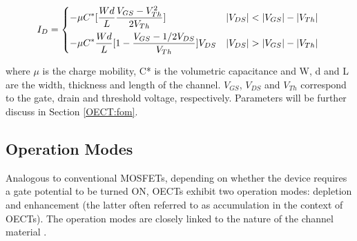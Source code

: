 \begin{equation}\label{eq:id}
	I_{D} = \begin{dcases*}
    -\mu C^{*} [\frac{Wd}{L}\frac{V_{GS}-V_{Th}^{2}}{2V_{Th}}] & \text{$|V_{DS}| < |V_{GS}|-|V_{Th}|$} \\
    -\mu C^{*} \frac{Wd}{L} [1 - \frac{V_{GS}-1/2 V_{DS}}{V_{Th}}] V_{DS} & \text{$|V_{DS}| > |V_{GS}|-|V_{Th}|$}
    \end{dcases*}
\end{equation}

where $\mu$ is the charge mobility, C* is the volumetric capacitance and W, d and L are the width, thickness and length of the channel. $V_{GS}$, $V_{DS}$ and $V_{Th}$ correspond to the gate, drain and threshold voltage, respectively. Parameters will be further discuss in Section \ref{OECT:fom}.  

\subsection{Operation Modes}

Analogous to conventional MOSFETs, depending on whether the device requires a gate potential to be turned ON, OECTs exhibit two operation modes: depletion and enhancement (the latter often referred to as accumulation in the context of OECTs). The operation modes are closely linked to the nature of the channel material%
.


